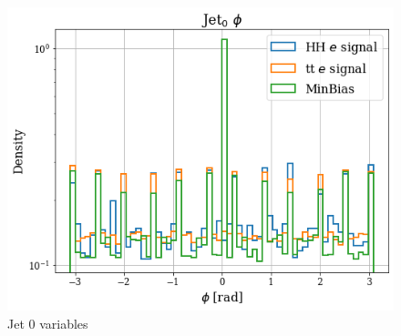 \documentclass[../main.tex]{subfiles}
\begin{document}
\begin{figure}[!ht]
\begin{minipage}[b]{0.33\linewidth}
    \centering
    \includegraphics[width=1\linewidth]{Chapters/Plots/Hist_1ele_jet0_Phi.png}
  \end{minipage}
  \caption{Jet 0 variables}
 \end{figure}
 
\end{document}
